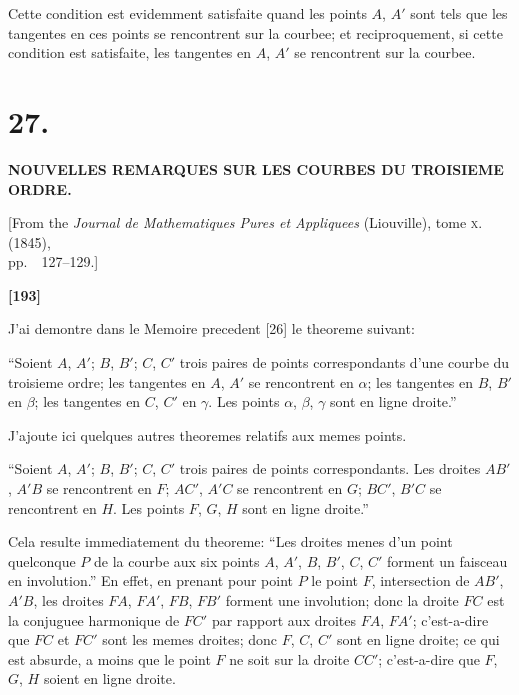 \documentclass[11pt,a4paper]{book}
\begin{document}
Cette condition est evidemment satisfaite quand les points $A$, $A'$ sont tels que les
tangentes en ces points se rencontrent sur la courbee; et reciproquement, si cette
condition est satisfaite, les tangentes en $A$, $A'$ se rencontrent sur la courbee.


\newpage
\section*{27.}

\begin{center}
\textbf{NOUVELLES REMARQUES SUR LES COURBES DU TROISIEME ORDRE.}
\end{center}

\begin{center}
[From the \textit{Journal de Mathematiques Pures et Appliquees} (Liouville), tome \textsc{x}. (1845),\\
pp.~~127--129.]
\end{center}


\textbf{[193]}

J'ai demontre dans le Memoire precedent [26] le theoreme suivant:

``Soient $A$, $A'$; $B$, $B'$; $C$, $C'$ trois paires de points correspondants d'une courbe
du troisieme ordre; les tangentes en $A$, $A'$ se rencontrent en $\alpha$; les tangentes en $B$, $B'$ en
$\beta$; les tangentes en $C$, $C'$ en $\gamma$. Les points $\alpha$, $\beta$, $\gamma$ sont en ligne droite.''

J'ajoute ici quelques autres theoremes relatifs aux memes points.

``Soient $A$, $A'$; $B$, $B'$; $C$, $C'$ trois paires de points correspondants. Les droites
$AB'$, $A'B$ se rencontrent en $F$; $AC'$, $A'C$ se rencontrent en $G$; $BC'$, $B'C$ se rencontrent
en $H$. Les points $F$, $G$, $H$ sont en ligne droite.''

Cela resulte immediatement du theoreme: ``Les droites menes d'un point
quelconque $P$ de la courbe aux six points $A$, $A'$, $B$, $B'$, $C$, $C'$ forment un faisceau en
involution.'' En effet, en prenant pour point $P$ le point $F$, intersection de $AB'$, $A'B$,
les droites $FA$, $FA'$, $FB$, $FB'$ forment une involution; donc la droite $FC$ est la
conjuguee harmonique de $FC'$ par rapport aux droites $FA$, $FA'$; c'est-a-dire que
$FC$ et $FC'$ sont les memes droites; donc $F$, $C$, $C'$ sont en ligne droite; ce qui est
absurde, a moins que le point $F$ ne soit sur la droite $CC'$; c'est-a-dire que $F$, $G$, $H$
soient en ligne droite.
\end{document}
